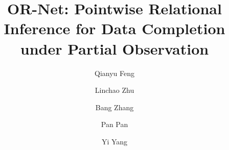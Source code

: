 \documentclass[sigconf]{acmart} %
\begin{document}
\title{OR-Net: Pointwise Relational Inference for Data Completion under Partial Observation}





\author{Qianyu Feng}
  
\author{Linchao Zhu}
  
\author{Bang Zhang}
  
\author{Pan Pan}
  
\author{Yi Yang}





\renewcommand{\shortauthors}{}%
\end{document}
